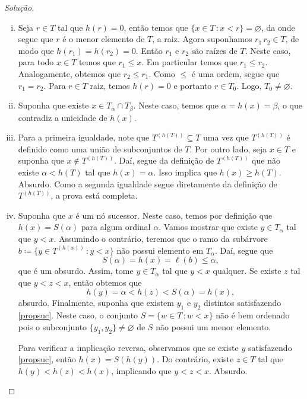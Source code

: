 \documentclass[a4paper]{article}
\begin{document}
\begin{proof}[Solução]\hfill
  \begin{enumerate}[(i)]

  \item Seja \(r\in T\) tal que \(h(r)=0\), então temos que \(\{x\in T\,\colon
    x<r\}=\varnothing\), da onde segue que \(r\) é o menor elemento de \(T\), a raiz.
    Agora suponhamos \(r_1\, r_2\in T\), de modo que \(h(r_1)=h(r_2)=0\). Então \(r_1\) e
    \(r_2\) são raízes de \(T\). Neste caso,  para todo \(x\in T\) temos que
    \(r_1\leq x\). Em particular temos que \(r_1\leq r_2\).
    Analogamente, obtemos que \(r_2\leq r_1\). Como \(\leq\) é
    uma ordem, segue que \(r_1=r_2\). Para \(r\in T\) raiz, temos \(h(r)=0\) e portanto
    \(r\in T_0\). Logo, \(T_0\not=\varnothing\).
    
  \item Suponha que existe \(x\in T_\alpha\cap T_\beta\). Neste caso, temos que
    \(\alpha=h(x)=\beta\), o que contradiz a unicidade de \(h(x)\).

  \item Para a primeira igualdade, note que \(T^{(h(T))}\subseteq T\) uma vez
    que \(T^{(h(T))}\) é definido como uma união de subconjuntos de \(T\). Por
    outro lado, seja \(x\in T\) e suponha que \(x\not\in T^{(h(T))}\). Daí,
    segue da definição de \(T^{(h(T))}\) que não existe \(\alpha < h(T)\) tal
    que \(h(x)=\alpha\). Isso implica
    que \(h(x)\geq h(T)\). Absurdo. Como a segunda igualdade segue diretamente da
    definição de \(T^{(h(T))}\), a prova está completa. 

  \item Suponha que \(x\) é um nó sucessor. Neste caso, temos por definição
    que \(h(x)=S(\alpha)\) para algum ordinal \(\alpha\). Vamos mostrar que
    existe \(y\in T_\alpha\) tal que \(y < x\). Assumindo o contrário, teremos
    que o ramo da subárvore \(b\coloneqq\{y\in T^{(h(x))}\,\colon y<x\}\) não possui elemento em
    \(T_\alpha\). Daí, segue que \[S(\alpha)=h(x)=\ell(b)\leq\alpha,\] que é um absurdo. 
    Assim, tome \(y\in T_\alpha\) tal que \(y<x\) qualquer. Se
    existe \(z\) tal que \(y<z<x\), então obtemos
    que \[h(y)=\alpha<h(z)<S(\alpha)=h(x),\] 
    absurdo. Finalmente, suponha que existem \(y_1\) e \(y_2\) distintos satisfazendo
    \eqref{propsuc}. Neste caso, o conjunto \(S=\{w\in
    T\,\colon w <x\}\) não é bem ordenado pois o subconjunto
    \(\{y_1,y_2\}\not = \varnothing\) de \(S\) não possui um menor elemento.

    Para verificar a implicação reversa, observamos que se existe \(y\) satisfazendo
    \eqref{propsuc}, então \(h(x)=S(h(y))\). Do contrário, existe \(z\in T\) tal
    que \(h(y)<h(z)<h(x)\), implicando que \(y<z<x\). Absurdo.


\end{enumerate}
\end{proof}
\end{document}
